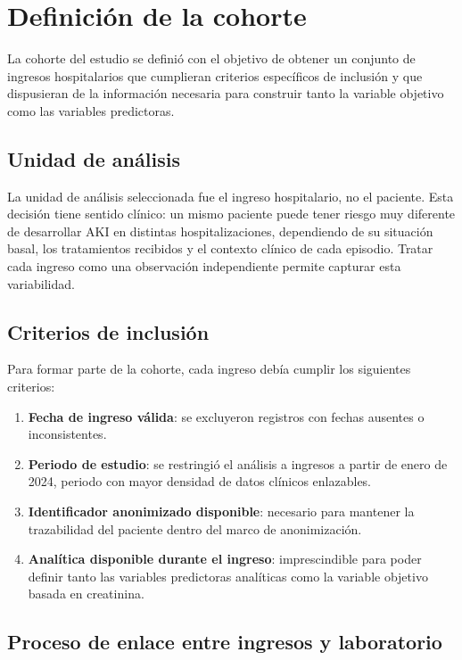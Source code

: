 \documentclass[12pt, a4paper, oneside]{report}
\begin{document}
\section{Definición de la cohorte}

La cohorte del estudio se definió con el objetivo de obtener un conjunto de ingresos hospitalarios que cumplieran criterios específicos de inclusión y que dispusieran de la información necesaria para construir tanto la variable objetivo como las variables predictoras.

\subsection{Unidad de análisis}

La unidad de análisis seleccionada fue el ingreso hospitalario, no el paciente. Esta decisión tiene sentido clínico: un mismo paciente puede tener riesgo muy diferente de desarrollar AKI en distintas hospitalizaciones, dependiendo de su situación basal, los tratamientos recibidos y el contexto clínico de cada episodio. Tratar cada ingreso como una observación independiente permite capturar esta variabilidad.

\subsection{Criterios de inclusión}

Para formar parte de la cohorte, cada ingreso debía cumplir los siguientes criterios:

\begin{enumerate}
    \item \textbf{Fecha de ingreso válida}: se excluyeron registros con fechas ausentes o inconsistentes.
    \item \textbf{Periodo de estudio}: se restringió el análisis a ingresos a partir de enero de 2024, periodo con mayor densidad de datos clínicos enlazables.
    \item \textbf{Identificador anonimizado disponible}: necesario para mantener la trazabilidad del paciente dentro del marco de anonimización.
    \item \textbf{Analítica disponible durante el ingreso}: imprescindible para poder definir tanto las variables predictoras analíticas como la variable objetivo basada en creatinina.
\end{enumerate}

\subsection{Proceso de enlace entre ingresos y laboratorio}
\end{document}
